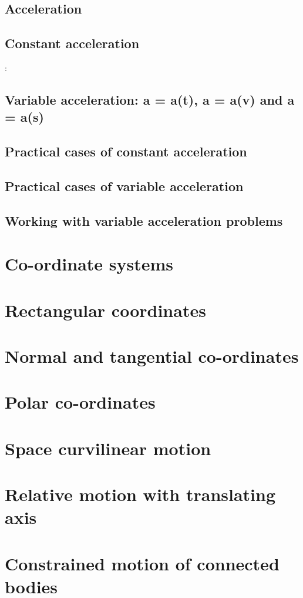 \subsection{Acceleration}


\subsection{Constant acceleration}: 
\subsection{Variable acceleration: a = a(t), a = a(v) and a = a(s)}
\subsection{Practical cases of constant acceleration}
\subsection{Practical cases of variable acceleration}
\subsection{Working with variable acceleration problems}
\section{Co-ordinate systems}
\section{Rectangular coordinates}
\section{Normal and tangential co-ordinates}
\section{Polar co-ordinates}
\section{Space curvilinear motion}
\section{Relative motion with translating axis}
\section{Constrained motion of connected bodies}